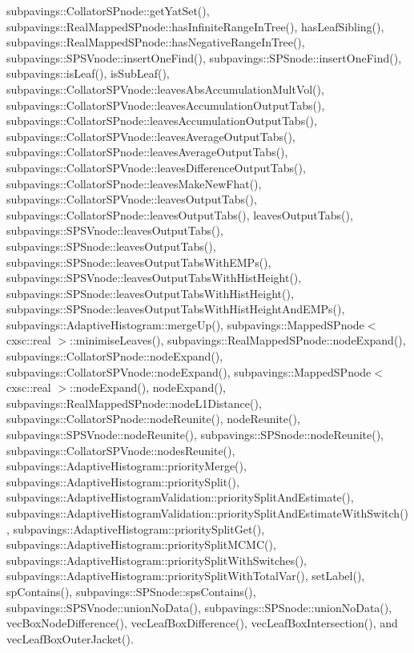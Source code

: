 subpavings\-::\-Collator\-S\-Pnode\-::get\-Yat\-Set(), subpavings\-::\-Real\-Mapped\-S\-Pnode\-::has\-Infinite\-Range\-In\-Tree(), has\-Leaf\-Sibling(), subpavings\-::\-Real\-Mapped\-S\-Pnode\-::has\-Negative\-Range\-In\-Tree(), subpavings\-::\-S\-P\-S\-Vnode\-::insert\-One\-Find(), subpavings\-::\-S\-P\-Snode\-::insert\-One\-Find(), subpavings\-::is\-Leaf(), is\-Sub\-Leaf(), subpavings\-::\-Collator\-S\-P\-Vnode\-::leaves\-Abs\-Accumulation\-Mult\-Vol(), subpavings\-::\-Collator\-S\-P\-Vnode\-::leaves\-Accumulation\-Output\-Tabs(), subpavings\-::\-Collator\-S\-Pnode\-::leaves\-Accumulation\-Output\-Tabs(), subpavings\-::\-Collator\-S\-P\-Vnode\-::leaves\-Average\-Output\-Tabs(), subpavings\-::\-Collator\-S\-Pnode\-::leaves\-Average\-Output\-Tabs(), subpavings\-::\-Collator\-S\-P\-Vnode\-::leaves\-Difference\-Output\-Tabs(), subpavings\-::\-Collator\-S\-Pnode\-::leaves\-Make\-New\-Fhat(), subpavings\-::\-Collator\-S\-P\-Vnode\-::leaves\-Output\-Tabs(), subpavings\-::\-Collator\-S\-Pnode\-::leaves\-Output\-Tabs(), leaves\-Output\-Tabs(), subpavings\-::\-S\-P\-S\-Vnode\-::leaves\-Output\-Tabs(), subpavings\-::\-S\-P\-Snode\-::leaves\-Output\-Tabs(), subpavings\-::\-S\-P\-Snode\-::leaves\-Output\-Tabs\-With\-E\-M\-Ps(), subpavings\-::\-S\-P\-S\-Vnode\-::leaves\-Output\-Tabs\-With\-Hist\-Height(), subpavings\-::\-S\-P\-Snode\-::leaves\-Output\-Tabs\-With\-Hist\-Height(), subpavings\-::\-S\-P\-Snode\-::leaves\-Output\-Tabs\-With\-Hist\-Height\-And\-E\-M\-Ps(), subpavings\-::\-Adaptive\-Histogram\-::merge\-Up(), subpavings\-::\-Mapped\-S\-Pnode$<$ cxsc\-::real $>$\-::minimise\-Leaves(), subpavings\-::\-Real\-Mapped\-S\-Pnode\-::node\-Expand(), subpavings\-::\-Collator\-S\-Pnode\-::node\-Expand(), subpavings\-::\-Collator\-S\-P\-Vnode\-::node\-Expand(), subpavings\-::\-Mapped\-S\-Pnode$<$ cxsc\-::real $>$\-::node\-Expand(), node\-Expand(), subpavings\-::\-Real\-Mapped\-S\-Pnode\-::node\-L1\-Distance(), subpavings\-::\-Collator\-S\-Pnode\-::node\-Reunite(), node\-Reunite(), subpavings\-::\-S\-P\-S\-Vnode\-::node\-Reunite(), subpavings\-::\-S\-P\-Snode\-::node\-Reunite(), subpavings\-::\-Collator\-S\-P\-Vnode\-::nodes\-Reunite(), subpavings\-::\-Adaptive\-Histogram\-::priority\-Merge(), subpavings\-::\-Adaptive\-Histogram\-::priority\-Split(), subpavings\-::\-Adaptive\-Histogram\-Validation\-::priority\-Split\-And\-Estimate(), subpavings\-::\-Adaptive\-Histogram\-Validation\-::priority\-Split\-And\-Estimate\-With\-Switch(), subpavings\-::\-Adaptive\-Histogram\-::priority\-Split\-Get(), subpavings\-::\-Adaptive\-Histogram\-::priority\-Split\-M\-C\-M\-C(), subpavings\-::\-Adaptive\-Histogram\-::priority\-Split\-With\-Switches(), subpavings\-::\-Adaptive\-Histogram\-::priority\-Split\-With\-Total\-Var(), set\-Label(), sp\-Contains(), subpavings\-::\-S\-P\-Snode\-::sps\-Contains(), subpavings\-::\-S\-P\-S\-Vnode\-::union\-No\-Data(), subpavings\-::\-S\-P\-Snode\-::union\-No\-Data(), vec\-Box\-Node\-Difference(), vec\-Leaf\-Box\-Difference(), vec\-Leaf\-Box\-Intersection(), and vec\-Leaf\-Box\-Outer\-Jacket().


